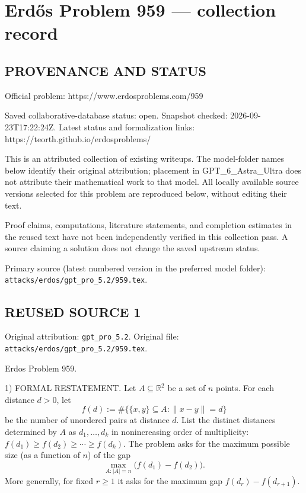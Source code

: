 \section*{Erd\H{o}s Problem 959 --- collection record}

\subsection*{PROVENANCE AND STATUS}
Official problem: https://www.erdosproblems.com/959

Saved collaborative-database status: open.
Snapshot checked: 2026-09-23T17:22:24Z.
Latest status and formalization links: https://teorth.github.io/erdosproblems/

This is an attributed collection of existing writeups. The model-folder names below identify their original attribution; placement in GPT\_6\_Astra\_Ultra does not attribute their mathematical work to that model. All locally available source versions selected for this problem are reproduced below, without editing their text.

Proof claims, computations, literature statements, and completion estimates in the reused text have not been independently verified in this collection pass. A source claiming a solution does not change the saved upstream status.

Primary source (latest numbered version in the preferred model folder): \texttt{attacks/erdos/gpt\_pro\_5.2/959.tex}.

\subsection*{REUSED SOURCE 1}
Original attribution: \texttt{gpt\_pro\_5.2}.
Original file: \texttt{attacks/erdos/gpt\_pro\_5.2/959.tex}.


Erdos Problem 959.

1) FORMAL RESTATEMENT.
Let $A\subseteq\mathbb{R}^2$ be a set of $n$ points.
For each distance $d>0$, let
\[
 f(d):=\#\{\{x,y\}\subseteq A: \|x-y\|=d\}
\]
be the number of unordered pairs at distance $d$.
List the distinct distances determined by $A$ as $d_1,\dots,d_k$ in nonincreasing order of multiplicity:
$f(d_1)\ge f(d_2)\ge\cdots\ge f(d_k)$.
The problem asks for the maximum possible size (as a function of $n$) of the gap
\[
\max_{A:|A|=n}\bigl(f(d_1)-f(d_2)\bigr).
\]
More generally, for fixed $r\ge 1$ it asks for the maximum gap $f(d_r)-f(d_{r+1})$.

